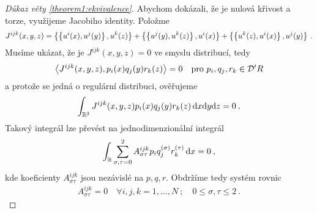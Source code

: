 \begin{proof}[Důkaz věty \ref{theorem1:ekvivalence}]
    Abychom dokázali, že je nulová křivost a torze, využijeme Jacobiho identity. Položme
    \begin{align}
        J^{ijk}(x,y,z) = \left \lbrace  \left \lbrace u^i(x),u^j(y) \right \rbrace, u^k(z)  \right \rbrace + \left \lbrace  \left \lbrace u^j(y), u^k(z) \right \rbrace, u^i(x) \right \rbrace + \left \lbrace  \left \lbrace u^k(z), u^i(x) \right \rbrace, u^j(y) \right \rbrace \:.
    \end{align}
    Musíme ukázat, že je $J^{ijk}(x,y,z) = 0$ ve smyslu distribucí, tedy
    \begin{align}
        \left \langle J^{ijk}(x,y,z) ,p_i(x)q_j(y)r_k(z) \right \rangle = 0 \quad \text{pro } p_i, q_j, r_k \in \mathcal{D'}{R}
    \end{align}
    a protože se jedná o regulární distribuci, ověřujeme
    \begin{align}
        \int_{\mathbb{R}^{3}} J^{ijk}(x,y,z) p_i(x)q_j(y)r_k(z) \, \mathrm{d} x \mathrm{d} y \mathrm{d} z = 0\:.
    \end{align}
    Takový integrál lze převést na jednodimenzionální integrál
    \begin{align}
        \int_{\mathbb{R}} \sum_{\sigma, \tau =0}^2 A^{ijk}_{\sigma \tau} p_i q_j^{(\sigma)} r_k^{(\tau)} \, \mathrm{d} x = 0 \:,
    \end{align}
    kde koeficienty $A^{ijk}_{\sigma \tau}$ jsou nezávislé na $p,q,r$.
    Obdržíme tedy systém rovnic \begin{align}
        A^{ijk}_{\sigma \tau} = 0 \quad \forall i,j,k=1, \dots ,N \:; \quad 0 \leq \sigma, \tau \leq 2 \:.
    \end{align}


\end{proof}
